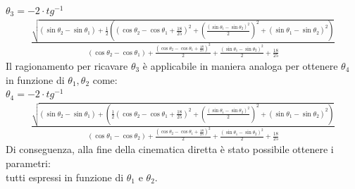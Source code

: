 \\$\theta_3 =-2\cdot tg^{-1}$
\begin{equation*}
    \begin{aligned}
   \frac{\sqrt{ (\sin\theta_2 - \sin\theta_1) + \frac{1}{2}((\cos\theta_2 - \cos\theta_1 + \frac{18}{25})^2+(\frac{(\sin\theta_1-\sin\theta_2)^2}{2})^2+(\sin\theta_1-\sin\theta_2)^2)}}{(\cos\theta_2-\cos\theta_1)+\frac{(\cos\theta_2-\cos\theta_1+\frac{18}{25})^2}{2}+\frac{(\sin\theta_1-\sin\theta_2)^2}{2}+\frac{18}{25}}
    \end{aligned}
\end{equation*}
Il ragionamento per ricavare $\theta_3$ è applicabile in maniera analoga per ottenere $\theta_4$ in funzione di $\theta_1, \theta_2$ come:
\\$\theta_4 = -2\cdot tg^{-1}$
\begin{equation*}
    \begin{aligned}
\frac{\sqrt{(\sin\theta_2-\sin\theta_1)+(\frac{1}{2}(\cos\theta_2-\cos\theta_1+\frac{18}{25})^2+(\frac{(\sin\theta_1-\sin\theta_2)^2}{2})^2+(\sin\theta_1-\sin\theta_2)^2)}}
    {(\cos\theta_1 -\cos\theta_2)+\frac{(\cos\theta_2-\cos\theta_1+\frac{18}{25})^2}{2}+\frac{(\sin\theta_1-\sin\theta_2)^2}{2}+\frac{18}{25}}
    \end{aligned}
\end{equation*}
Di conseguenza, alla fine della cinematica diretta è stato possibile ottenere i parametri:
\begin{equation*}
	[x,y, E1, E2, \theta_3, \theta_4]
\end{equation*}
tutti espressi in funzione di $\theta_1$ e $\theta_2$.
